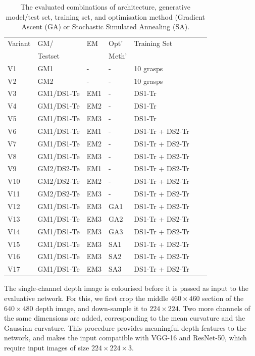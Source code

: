 \begin{table}[b]
\footnotesize
\centering
\begin{tabular}{|l|l|l|l|l|l|l|}
\hline
Variant & GM/  & EM & Opt'  & Training Set \\ 
 & Testset & & Meth' & \\ \hline
V1 & GM1    & - & - & 10 grasps  \\ \hline
V2 & GM2    & - & - & 10 grasps  \\ \hline
V3 & GM1/DS1-Te & EM1 & - & DS1-Tr \\ \hline
V4 & GM1/DS1-Te & EM2 & - & DS1-Tr \\ \hline
V5 & GM1/DS1-Te & EM3 & - & DS1-Tr  \\ \hline
V6 & GM1/DS1-Te & EM1 & - & DS1-Tr + DS2-Tr \\ \hline
V7 & GM1/DS1-Te & EM2 & - & DS1-Tr + DS2-Tr \\ \hline
V8 & GM1/DS1-Te & EM3 & - & DS1-Tr + DS2-Tr \\ \hline
V9 & GM2/DS2-Te & EM1 & - & DS1-Tr + DS2-Tr \\ \hline
V10 & GM2/DS2-Te & EM2 & - & DS1-Tr + DS2-Tr \\ \hline
V11 & GM2/DS2-Te & EM3 & - & DS1-Tr + DS2-Tr \\ \hline
V12 & GM1/DS1-Te & EM3 & GA1 & DS1-Tr + DS2-Tr \\ \hline
V13 & GM1/DS1-Te & EM3 & GA2 & DS1-Tr + DS2-Tr \\ \hline
V14 & GM1/DS1-Te & EM3 & GA3 & DS1-Tr + DS2-Tr \\ \hline
V15 & GM1/DS1-Te & EM3 & SA1 & DS1-Tr + DS2-Tr \\ \hline
V16 & GM1/DS1-Te & EM3 & SA2 & DS1-Tr + DS2-Tr \\ \hline
V17 & GM1/DS1-Te & EM3 & SA3 & DS1-Tr + DS2-Tr \\ \hline
\end{tabular}
\caption{The evaluated combinations of architecture, generative model/test set, training set, and optimisation method (Gradient Ascent (GA) or Stochastic Simulated Annealing (SA).}
\label{table:GEBreakdown}
\end{table}

The single-channel depth image is colourised before it is passed as input to the evaluative network. For this, we first crop the middle $460 \times 460$ section of the $640 \times 480$ depth image, and down-sample it to $224 \times 224$. Two more channels of the same dimensions are added, corresponding to the mean curvature and the Gaussian curvature. %
This procedure provides meaningful depth features to the network, and makes the input compatible with VGG-16 and ResNet-50, which require input images of size $224 \times 224 \times 3$.

